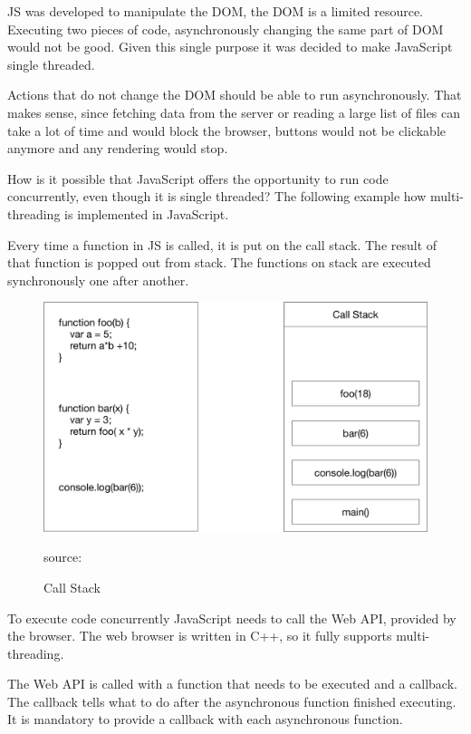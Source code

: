 \gls{JS} was developed to manipulate the DOM, the DOM is a limited resource. Executing two pieces of code, asynchronously changing the same part of DOM would not be good. Given this single purpose it was decided to make JavaScript single threaded.

Actions that do not change the DOM should be able to run asynchronously. That makes sense, since fetching data from the server or reading a large list of files can take a lot of time and would block the browser, buttons would not be clickable anymore and any rendering would stop. 

How is it possible that JavaScript offers the opportunity to run code concurrently, even though it is single threaded? The following example how multi-threading is implemented in JavaScript.

Every time a function in \gls{JS} is called, it is put on the call stack. The result of that function is popped out from stack. The functions on stack are executed synchronously one after another.

\begin{figure}[H]
	\centering
	\includegraphics[width=\linewidth]{bilder/grundlagen/CallStack.png}
	\caption{Call Stack} source:\cite{CallStack}
	\label{fig:CS}
\end{figure}

To execute code concurrently JavaScript needs to call the Web API, provided by the browser. The web browser is written in C++, so it fully supports multi-threading.

The Web API is called with a function that needs to be executed and a callback.
The callback tells what to do after the asynchronous function finished executing. It is mandatory to provide a callback with each asynchronous function.


